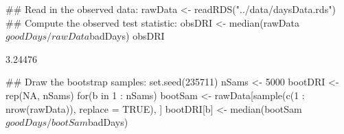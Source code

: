 \begin{Schunk}
\begin{Sinput}
 ## Read in the observed data:
 rawData <- readRDS("../data/daysData.rds")
 ## Compute the observed test statistic:
 obsDRI <- median(rawData$goodDays / rawData$badDays)
 obsDRI
\end{Sinput}
\begin{Soutput}
[1] 3.24476
\end{Soutput}
\begin{Sinput}
 ## Draw the bootstrap samples:
 set.seed(235711)
 nSams <- 5000
 bootDRI <- rep(NA, nSams)
 for(b in 1 : nSams) {
     bootSam <- rawData[sample(c(1 : nrow(rawData)),
                               replace = TRUE), ]
     bootDRI[b] <- 
         median(bootSam$goodDays / bootSam$badDays)
 }
\end{Sinput}
\end{Schunk}
